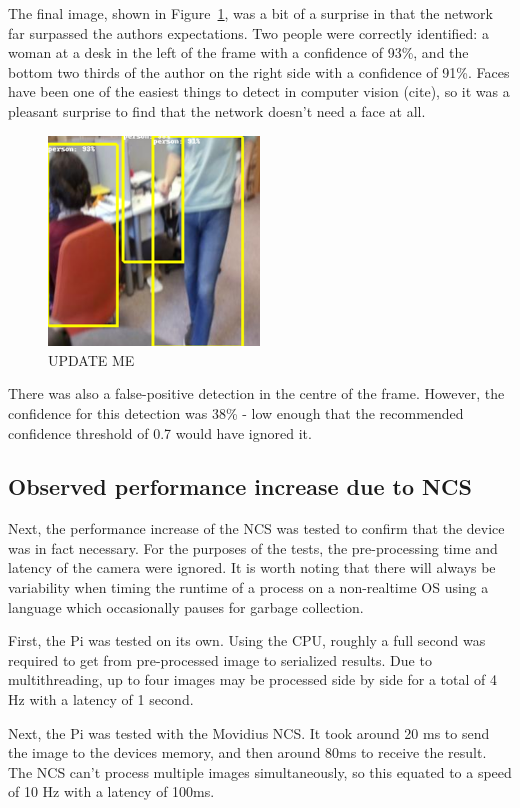 The final image, shown in Figure~\ref{fig:box_around_people_hard}, was a bit of a surprise in that the network far surpassed the authors expectations. Two people were correctly identified: a woman at a desk in the left of the frame with a confidence of 93\%, and the bottom two thirds of the author on the right side with a confidence of 91\%. Faces have been one of the easiest things to detect in computer vision {\color{red} (cite)}, so it was a pleasant surprise to find that the network doesn't need a face at all.

\begin{figure}[h!]
  \centering
  \includegraphics[width=0.5\textwidth]{methodology/box_around_people_hard}
  \caption{{\label{fig:box_around_people_hard} UPDATE ME}}
\end{figure}

There was also a false-positive detection in the centre of the frame. However, the confidence for this detection was 38\% - low enough that the recommended confidence threshold of 0.7 would have ignored it.%

\subsection{Observed performance increase due to NCS}
Next, the performance increase of the NCS was tested to confirm that the device was in fact necessary. For the purposes of the tests, the pre-processing time and latency of the camera were ignored. It is worth noting that there will always be variability when timing the runtime of a process on a non-realtime OS using a language which occasionally pauses for garbage collection.

First, the Pi was tested on its own. Using the CPU, roughly a full second was required to get from pre-processed image to serialized results. Due to multithreading, up to four images may be processed side by side for a total of 4 Hz with a latency of 1 second.

Next, the Pi was tested with the Movidius NCS. It took around 20 ms to send the image to the devices memory, and then around 80ms to receive the result. The NCS can't process multiple images simultaneously, so this equated to a speed of 10 Hz with a latency of 100ms.

